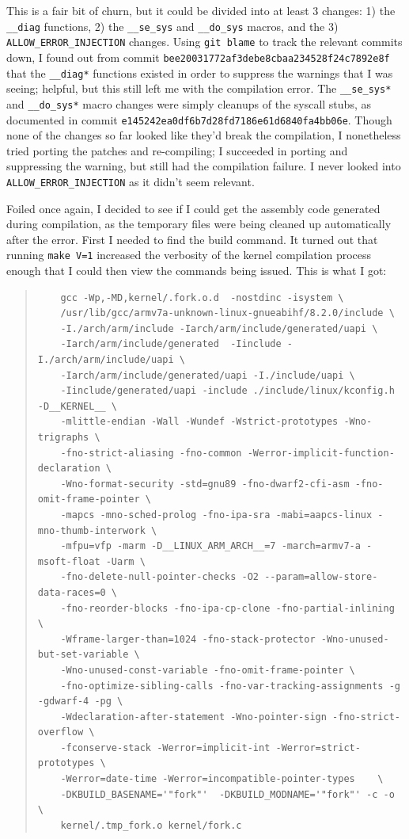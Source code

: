 \documentclass{article}
\begin{document}
This is a fair bit of churn, but it could be divided into at least 3 changes: 1) the \texttt{__diag} functions, 2) the \texttt{__se_sys} and \texttt{__do_sys} macros, and the 3) \texttt{ALLOW_ERROR_INJECTION} changes.  Using \texttt{git blame} to track the relevant commits down, I found out from commit \texttt{bee20031772af3debe8cbaa234528f24c7892e8f} that the \texttt{__diag*} functions existed in order to suppress the warnings that I was seeing; helpful, but this still left me with the compilation error.  The \texttt{__se_sys*} and \texttt{__do_sys*} macro changes were simply cleanups of the syscall stubs, as documented in commit \texttt{e145242ea0df6b7d28fd7186e61d6840fa4bb06e}.  Though none of the changes so far looked like they'd break the compilation, I nonetheless tried porting the patches and re-compiling; I succeeded in porting and suppressing the warning, but still had the compilation failure.  I never looked into \texttt{ALLOW_ERROR_INJECTION} as it didn't seem relevant.

Foiled once again, I decided to see if I could get the assembly code generated during compilation, as the temporary files were being cleaned up automatically after the error.  First I needed to find the build command.  It turned out that running \texttt{make V=1} increased the verbosity of the kernel compilation process enough that I could then view the commands being issued.  This is what I got:

\begin{quote}
\begin{verbatim}
	gcc -Wp,-MD,kernel/.fork.o.d  -nostdinc -isystem \
	/usr/lib/gcc/armv7a-unknown-linux-gnueabihf/8.2.0/include \
	-I./arch/arm/include -Iarch/arm/include/generated/uapi \
	-Iarch/arm/include/generated  -Iinclude -I./arch/arm/include/uapi \
	-Iarch/arm/include/generated/uapi -I./include/uapi \
	-Iinclude/generated/uapi -include ./include/linux/kconfig.h -D__KERNEL__ \
	-mlittle-endian -Wall -Wundef -Wstrict-prototypes -Wno-trigraphs \
	-fno-strict-aliasing -fno-common -Werror-implicit-function-declaration \
	-Wno-format-security -std=gnu89 -fno-dwarf2-cfi-asm -fno-omit-frame-pointer \
	-mapcs -mno-sched-prolog -fno-ipa-sra -mabi=aapcs-linux -mno-thumb-interwork \
	-mfpu=vfp -marm -D__LINUX_ARM_ARCH__=7 -march=armv7-a -msoft-float -Uarm \
	-fno-delete-null-pointer-checks -O2 --param=allow-store-data-races=0 \
	-fno-reorder-blocks -fno-ipa-cp-clone -fno-partial-inlining \
	-Wframe-larger-than=1024 -fno-stack-protector -Wno-unused-but-set-variable \
	-Wno-unused-const-variable -fno-omit-frame-pointer \
	-fno-optimize-sibling-calls -fno-var-tracking-assignments -g -gdwarf-4 -pg \
	-Wdeclaration-after-statement -Wno-pointer-sign -fno-strict-overflow \
	-fconserve-stack -Werror=implicit-int -Werror=strict-prototypes \
	-Werror=date-time -Werror=incompatible-pointer-types    \
	-DKBUILD_BASENAME='"fork"'  -DKBUILD_MODNAME='"fork"' -c -o \
	kernel/.tmp_fork.o kernel/fork.c
\end{verbatim}
\end{quote}
\end{document}
